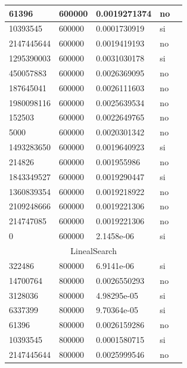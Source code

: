 \documentclass[12pt, fleqn]{article}                             %
\theoremstyle{break}                                            %
\begin{document}
\begin{longtable}{|m{5em}|m{5em}|m{10em}|m{5em}|@{}m{0pt}@{}}
            61396& 600000  & 0.0019271374 & no &\\[1em]    \hline
            10393545& 600000  & 0.0001730919 & si &\\[1em]    \hline
            2147445644& 600000  & 0.0019419193 & no &\\[1em]    \hline
            1295390003& 600000  & 0.0031030178 & si &\\[1em]    \hline
            450057883& 600000  & 0.0026369095 & no &\\[1em]    \hline
            187645041& 600000  & 0.0026111603 & no &\\[1em]    \hline
            1980098116& 600000  & 0.0025639534 & no &\\[1em]    \hline
            152503& 600000  & 0.0022649765 & no &\\[1em]    \hline
            5000& 600000  & 0.0020301342 & no &\\[1em]    \hline
            1493283650& 600000  & 0.0019640923 & si &\\[1em]    \hline
            214826& 600000  & 0.001955986 & no &\\[1em]    \hline
            1843349527& 600000  & 0.0019290447 & si &\\[1em]    \hline
            1360839354& 600000  & 0.0019218922 & no &\\[1em]    \hline
            2109248666& 600000  & 0.0019221306 & no &\\[1em]    \hline
            214747085& 600000  & 0.0019221306 & no &\\[1em]    \hline
            0& 600000  & 2.1458e-06 & si &\\[1em]    \hline
            \multicolumn{5}{|c|}{LinealSearch}   \\          \hline
            322486& 800000  & 6.9141e-06 & si &\\[1em]    \hline
            14700764& 800000  & 0.0026550293 & no &\\[1em]    \hline
            3128036& 800000  & 4.98295e-05 & si &\\[1em]    \hline
            6337399& 800000  & 9.70364e-05 & si &\\[1em]    \hline
            61396& 800000  & 0.0026159286 & no &\\[1em]    \hline
            10393545& 800000  & 0.0001580715 & si &\\[1em]    \hline
            2147445644& 800000  & 0.0025999546 & no &\\[1em]    \hline

\end{longtable}
\end{document}
